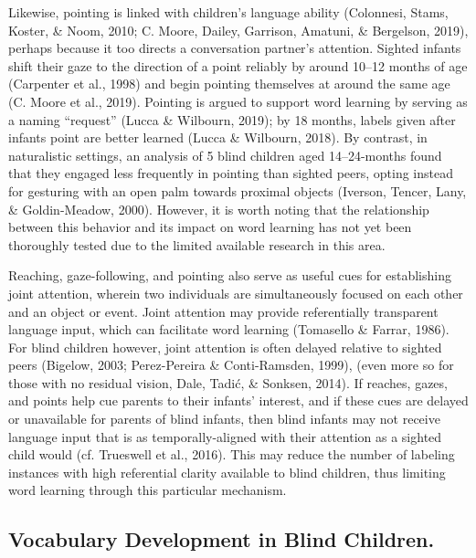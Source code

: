 \documentclass[
  man,floatsintext]{apa6}
\begin{document}
Likewise, pointing is linked with children's language ability (Colonnesi, Stams, Koster, \& Noom, 2010; C. Moore, Dailey, Garrison, Amatuni, \& Bergelson, 2019), perhaps because it too directs a conversation partner's attention. Sighted infants shift their gaze to the direction of a point reliably by around 10--12 months of age (Carpenter et al., 1998) and begin pointing themselves at around the same age (C. Moore et al., 2019). Pointing is argued to support word learning by serving as a naming ``request'' (Lucca \& Wilbourn, 2019); by 18 months, labels given after infants point are better learned (Lucca \& Wilbourn, 2018). By contrast, in naturalistic settings, an analysis of 5 blind children aged 14--24-months found that they engaged less frequently in pointing than sighted peers, opting instead for gesturing with an open palm towards proximal objects (Iverson, Tencer, Lany, \& Goldin-Meadow, 2000). However, it is worth noting that the relationship between this behavior and its impact on word learning has not yet been thoroughly tested due to the limited available research in this area.

Reaching, gaze-following, and pointing also serve as useful cues for establishing joint attention, wherein two individuals are simultaneously focused on each other and an object or event. Joint attention may provide referentially transparent language input, which can facilitate word learning (Tomasello \& Farrar, 1986). For blind children however, joint attention is often delayed relative to sighted peers (Bigelow, 2003; Perez-Pereira \& Conti-Ramsden, 1999), (even more so for those with no residual vision, Dale, Tadić, \& Sonksen, 2014). If reaches, gazes, and points help cue parents to their infants' interest, and if these cues are delayed or unavailable for parents of blind infants, then blind infants may not receive language input that is as temporally-aligned with their attention as a sighted child would (cf. Trueswell et al., 2016). This may reduce the number of labeling instances with high referential clarity available to blind children, thus limiting word learning through this particular mechanism.

\hypertarget{vocabulary-development-in-blind-children.}{%
\subsection{Vocabulary Development in Blind Children.}\label{vocabulary-development-in-blind-children.}}
\end{document}
